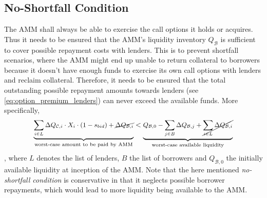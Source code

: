 \documentclass[a4paper]{article}
\begin{document}
\subsection{No-Shortfall Condition}
The AMM shall always be able to exercise the call options it holds or acquires. Thus it needs to be ensured that the AMM's liquidity inventory $Q_\mathcal{B}$ is sufficient to cover possible repayment costs with lenders. This is to prevent shortfall scenarios, where the AMM might end up unable to return collateral to borrowers because it doesn't have enough funds to exercise its own call options with lenders and reclaim collateral. Therefore, it needs to be ensured that the total outstanding possible repayment amounts towards lenders (see \cref{eq:option_premium_lenders}) can never exceed the available funds. More specifically,
\begin{equation}
\begin{split}
\small
\underbrace{ \sum_{i \in L} \Delta Q_{\mathcal{C},i} \cdot X_i \cdot (1-s_{bid})  + \cancel{\Delta Q_{\mathcal{B},i}} }_{\textrm{worst-case amount to be paid by AMM}} < \underbrace{ Q_{\mathcal{B},0} - \sum_{j \in B} \Delta Q_{\mathcal{B},j} + \cancel{\sum_{i \in L} \Delta Q_{\mathcal{B},i}} }_{\textrm{worst-case available liquidity}}
\end{split}
\end{equation}
, where $L$ denotes the list of lenders, $B$ the list of borrowers and $Q_{\mathcal{B}, 0}$ the initially available liquidity at inception of the AMM. Note that the here mentioned \emph{no-shortfall condition} is conservative in that it neglects possible borrower repayments, which would lead to more liquidity being available to the AMM.




\end{document}
